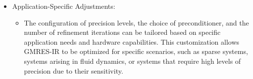 \begin{itemize}
\begin{itemize}
    \end{itemize}
    \item Application-Specific Adjustments:
    \begin{itemize}
        \item The configuration of precision levels, the choice of preconditioner, and the number of refinement iterations can be tailored based on specific application needs and hardware capabilities. This customization allows GMRES-IR to be optimized for specific scenarios, such as sparse systems, systems arising in fluid dynamics, or systems that require high levels of precision due to their sensitivity.
    \end{itemize}
\end{itemize}
